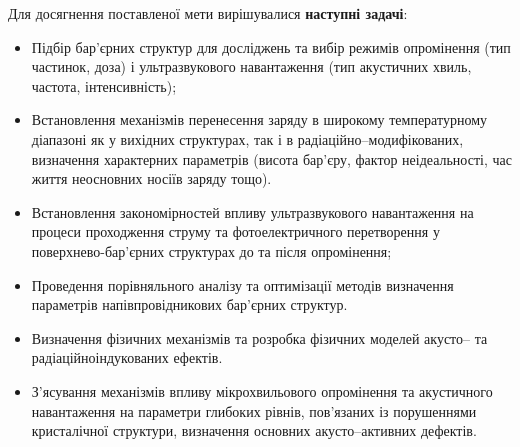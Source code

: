 Для досягнення поставленої мети вирішувалися \textbf{наступні задачі}:
\begin{itemize}[leftmargin=0em,itemindent=1.5em]
\renewcommand{\labelitemi}{$\bullet$}
  \item Підбір бар'єрних структур для досліджень та вибір режимів опромінення (тип частинок, доза) і ультразвукового навантаження (тип акустичних хвиль, частота, інтенсивність);

  \item Встановлення механізмів перенесення заряду в широкому температурному діапазоні як у вихідних структурах, так і в радіаційно--модифікованих, визначення характерних параметрів (висота бар'єру, фактор неідеальності, час життя неосновних носіїв заряду тощо).

\item Встановлення закономірностей впливу ультразвукового навантаження на процеси проходження струму та фотоелектричного перетворення у поверхнево-бар'єрних структурах до та після опромінення;


 \item Проведення порівняльного аналізу та оптимізації методів визначення параметрів напівпровідникових бар'єрних структур.
%


  \item Визначення фізичних механізмів та розробка фізичних моделей акусто-- та радіаційноіндукованих ефектів.

  \item З'ясування механізмів впливу мікрохвильового опромінення та акустичного навантаження на параметри глибоких рівнів, пов'язаних із порушеннями кристалічної структури,
  визначення основних акусто--активних дефектів.

\end{itemize}



